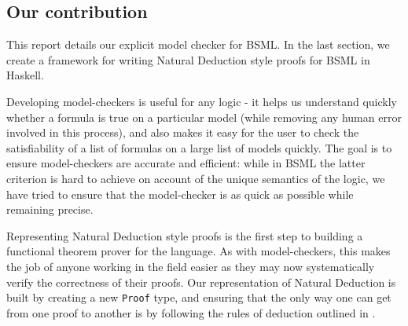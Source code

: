 \subsection{Our contribution}
This report details our explicit model checker for BSML. In the last section, we create a framework for writing Natural Deduction style
proofs for BSML in Haskell. 

Developing model-checkers is useful for any logic - it helps us understand quickly whether a formula is true on a particular model (while removing any human 
error involved in this process), and also makes it easy for the user to check the satisfiability of a list of formulas on a large list of models quickly. 
The goal is to ensure model-checkers are accurate and efficient: while in BSML the latter criterion is hard to achieve on account of the unique 
semantics of the logic, we have tried to ensure that the model-checker is as quick as possible while remaining precise.

Representing Natural Deduction style proofs is the first step to building a functional theorem prover for the language. As with model-checkers, this makes the 
job of anyone working in the field easier as they may now systematically verify the correctness of their proofs. Our representation of Natural Deduction is built by creating a new \verb|Proof| type, and ensuring that the only 
way one can get from one proof to another is by following the rules of deduction outlined in \cite{Aloni2024}. 